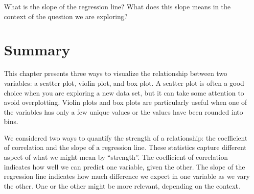 What is the slope of the regression line? What does this slope means in
the context of the question we are exploring?

\section{Summary}\label{summary}

This chapter presents three ways to visualize the relationship between
two variables: a scatter plot, violin plot, and box plot. A scatter plot
is often a good choice when you are exploring a new data set, but it can
take some attention to avoid overplotting. Violin plots and box plots
are particularly useful when one of the variables has only a few unique
values or the values have been rounded into bins.

We considered two ways to quantify the strength of a relationship: the
coefficient of correlation and the slope of a regression line. These
statistics capture different aspect of what we might mean by
``strength''. The coefficient of correlation indicates how well we can
predict one variable, given the other. The slope of the regression line
indicates how much difference we expect in one variable as we vary the
other. One or the other might be more relevant, depending on the
context.


